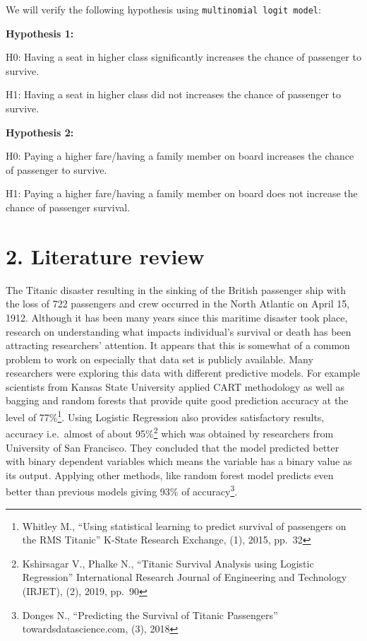\documentclass[
]{article}
\begin{document}
We will verify the following hypothesis using
\texttt{multinomial\ logit\ model}:

\textbf{Hypothesis 1:}

H0: Having a seat in higher class significantly increases the chance of
passenger to survive.

H1: Having a seat in higher class did not increases the chance of
passenger to survive.

\textbf{Hypothesis 2:}

H0: Paying a higher fare/having a family member on board increases the
chance of passenger to survive.

H1: Paying a higher fare/having a family member on board does not
increase the chance of passenger survival.

\hypertarget{literature-review}{%
\section{2. Literature review}\label{literature-review}}

The Titanic disaster resulting in the sinking of the British passenger
ship with the loss of 722 passengers and crew occurred in the North
Atlantic on April 15, 1912. Although it has been many years since this
maritime disaster took place, research on understanding what impacts
individual's survival or death has been attracting researchers'
attention. It appears that this is somewhat of a common problem to work
on especially that data set is publicly available. Many researchers were
exploring this data with different predictive models. For example
scientists from Kansas State University applied CART methodology as well
as bagging and random forests that provide quite good prediction
accuracy at the level of 77\%\footnote{Whitley M., ``Using statistical
  learning to predict survival of passengers on the RMS Titanic''
  K-State Research Exchange, (1), 2015, pp.~32}. Using Logistic
Regression also provides satisfactory results, accuracy i.e.~almost of
about 95\%\footnote{Kshirsagar V., Phalke N., ``Titanic Survival
  Analysis using Logistic Regression'' International Research Journal of
  Engineering and Technology (IRJET), (2), 2019, pp.~90} which was
obtained by researchers from University of San Francisco. They concluded
that the model predicted better with binary dependent variables which
means the variable has a binary value as its output. Applying other
methods, like random forest model predicts even better than previous
models giving 93\% of accuracy\footnote{Donges N., ``Predicting the
  Survival of Titanic Passengers'' towardsdatascience.com, (3), 2018}.
\end{document}
